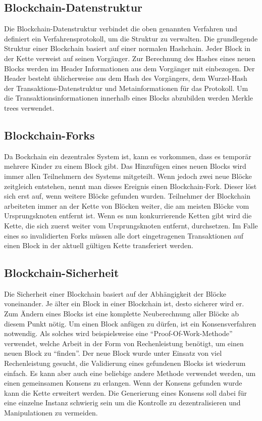 \subsection{Blockchain-Datenstruktur}
Die Blockchain-Datenstruktur verbindet die oben genannten Verfahren und definiert ein Verfahrensprotokoll, um die Struktur zu verwalten. Die grundlegende Struktur einer Blockchain basiert auf einer normalen Hashchain. Jeder Block in der Kette verweist auf seinen Vorgänger. Zur Berechnung des Hashes eines neuen Blocks werden im Header Informationen aus dem Vorgänger mit einbezogen. Der Header besteht üb­li­cher­wei­se aus dem Hash des Vorgängers, dem Wurzel-Hash der Transaktions-Datenstruktur und Metainformationen für das Protokoll. Um die Transaktionsinformationen innerhalb eines Blocks abzubilden werden Merkle trees verwendet. \cite[S.197ff]{5841204}
\subsection{Blockchain-Forks}
Da Bockchain ein dezentrales System ist, kann es vorkommen, dass es temporär mehrere Kinder zu einem Block gibt. Das Hinzufügen eines neuen Blocks wird immer allen Teilnehmern des Systems mitgeteilt. Wenn jedoch zwei neue Blöcke zeitgleich entstehen, nennt man dieses Ereignis einen Blockchain-Fork. Dieser löst sich erst auf, wenn weitere Blöcke gefunden wurden. Teilnehmer der Blockchain arbeiteten immer an der Kette von Blöcken weiter, die am meisten Blöcke vom Ursprungsknoten entfernt ist. Wenn es nun konkurrierende Ketten gibt wird die Kette, die sich zuerst weiter vom Ursprungsknoten entfernt, durchsetzen. Im Falle eines so invalidierten Forks müssen alle dort eingetragenen Transaktionen auf einen Block in der aktuell gültigen Kette transferiert werden.\cite[S.199, 241ff]{5841204}
\subsection{Blockchain-Sicherheit}
Die Sicherheit einer Blockchain basiert auf der Abhängigkeit der Blöcke voneinander. Je älter ein Block in einer Blockchain ist, desto sicherer wird er. Zum Ändern eines Blocks ist eine komplette Neuberechnung aller Blöcke ab diesem Punkt nötig. Um einen Block anfügen zu dürfen, ist ein Konsensverfahren notwendig. Als solches wird beispielsweise eine "`Proof-Of-Work-Methode"' verwendet, welche Arbeit in der Form von Rechenleistung benötigt, um einen neuen Block zu "`finden"'. Der neue Block wurde unter Einsatz von viel Rechenleistung gesucht, die Validierung eines gefundenen Blocks ist wiederum einfach. Es kann aber auch eine beliebige andere Methode verwendet werden, um einen gemeinsamen Konsens zu erlangen. Wenn der Konsens gefunden wurde kann die Kette erweitert werden. Die Generierung eines Konsens soll dabei für eine einzelne Instanz schwierig sein um die Kontrolle zu dezentralisieren und Manipulationen zu vermeiden.\cite[S.219]{5841204}
